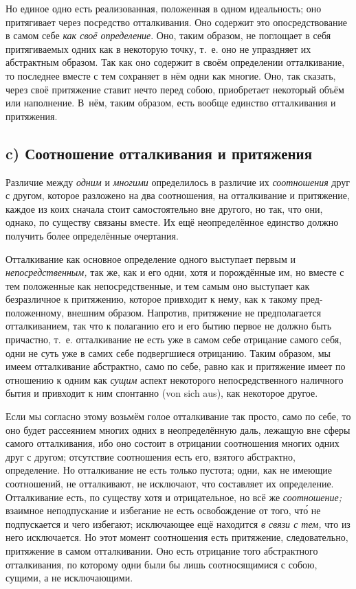 Но единое одно есть реализованная, положенная в одном идеальность; оно
притягивает через посредство отталкивания. Оно содержит это
опосредствование в самом себе {\em как своё
определение}. Оно, таким образом, не поглощает в себя притягиваемых одних
как в некоторую точку, т.~е. оно не упраздняет их абстрактным образом. Так
как оно содержит в своём определении отталкивание, то последнее вместе с
тем сохраняет в нём одни как многие. Оно, так сказать, через своё
притяжение ставит нечто перед собою, приобретает некоторый объём или
наполнение. В~нём, таким образом, есть вообще единство отталкивания и
притяжения.

\subsection[c) Соотношение отталкивания и притяжения]%
{c) Соотношение отталкивания и притяжения}

Различие между {\em одним} и {\em многими} определилось в различие их
{\em соотношения} друг с другом, которое разложено на два соотношения, на
отталкивание и притяжение, каждое из коих сначала стоит самостоятельно вне
другого, но так, что они, однако, по существу связаны вместе. Их ещё
неопределённое единство должно получить более определённые очертания.

Отталкивание как основное определение одного выступает первым и
{\em непосредственным,} так же, как и его одни, хотя и
порождённые им, но вместе с тем положенные как непосредственные, и тем
самым оно выступает как безразличное к притяжению, которое привходит к
нему, как к такому пред-положенному, внешним образом. Напротив, притяжение
не предполагается отталкиванием, так что к полаганию его и его бытию первое
не должно быть причастно, т.~е. отталкивание не есть уже в самом себе
отрицание самого себя, одни не суть уже в самих себе подвергшиеся
отрицанию. Таким образом, мы имеем отталкивание абстрактно, само по себе,
равно как и притяжение имеет по отношению к одним как
{\em сущим} аспект некоторого непосредственного наличного бытия и
привходит к ним спонтанно (von sich aus), как некоторое другое.

Если мы согласно этому возьмём голое отталкивание так просто, само по себе,
то оно будет рассеянием многих одних в неопределённую даль, лежащую вне
сферы самого отталкивания, ибо оно состоит в отрицании соотношения многих
одних друг с другом; отсутствие соотношения есть его, взятого абстрактно,
определение. Но отталкивание не есть только пустота; одни, как не имеющие
соотношений, не отталкивают, не исключают, что составляет их определение.
Отталкивание есть, по существу хотя и отрицательное, но всё же
{\em соотношение;} взаимное неподпускание и избегание
не есть освобождение от того, чт\'{о} не подпускается и чего избегают;
исключающее ещё находится {\em в связи с тем,} что из
него исключается. Но этот момент соотношения есть притяжение,
следовательно, притяжение в самом отталкивании. Оно есть отрицание того
абстрактного отталкивания, по которому одни были бы лишь соотносящимися с
собою, сущими, а не исключающими.

